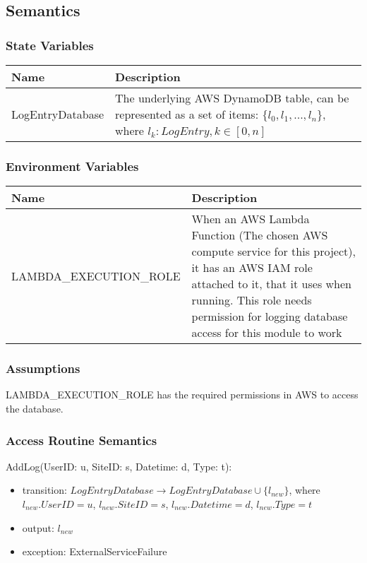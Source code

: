 \documentclass[12pt, titlepage]{article}
\begin{document}
\subsection{Semantics}

\subsubsection{State Variables}

\begin{center}
  \begin{tabular}{p{4cm} p{12cm}}
    \hline
    \textbf{Name} & \textbf{Description} \\
    \hline
    LogEntryDatabase & The underlying AWS DynamoDB table, can be
    represented as a set of items: $\{l_0, l_1, ..., l_n\}$, where
    $l_k: LogEntry, k\in[0,n]$ \\
    \hline
  \end{tabular}
\end{center}

\subsubsection{Environment Variables}

\begin{center}
  \begin{tabular}{p{6cm} p{10cm}}
    \hline
    \textbf{Name} & \textbf{Description} \\
    \hline
    LAMBDA\_EXECUTION\_ROLE & When an AWS Lambda Function (The chosen
    AWS compute service for this project), it has an AWS IAM role
    attached to it, that it uses when running. This role needs
    permission for logging database access for this module to work \\
    \hline
  \end{tabular}
\end{center}

\subsubsection{Assumptions}

LAMBDA\_EXECUTION\_ROLE has the required permissions in AWS to access
the database.

\subsubsection{Access Routine Semantics}

\noindent AddLog(UserID: u, SiteID: s, Datetime: d, Type: t):
\begin{itemize}
  \item transition: $LogEntryDatabase \rightarrow LogEntryDatabase
    \cup \{l_{new}\}$, where $l_{new}.UserID = u$, $l_{new}.SiteID =
    s$, $l_{new}.Datetime = d$, $l_{new}.Type = t$
  \item output: $l_{new}$
  \item exception: ExternalServiceFailure
\end{itemize}
\end{document}
